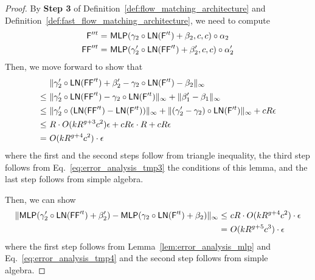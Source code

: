 \begin{proof}
    By {\bf Step 3} of Definition~\ref{def:flow_matching_architecture} and Definition~\ref{def:fast_flow_matching_architecture}, we need to compute
    \begin{align*}
        \mathsf{F}''^t =&~\mathsf{MLP}(\gamma_2 \circ \mathsf{LN}(\mathsf{F}'^t)+ \beta_2,c,c) \circ \alpha_2\\
        \mathsf{FF}''^t=&~\mathsf{MLP}(\gamma'_2 \circ \mathsf{LN}(\mathsf{FF}'^t)+ \beta'_2,c,c) \circ \alpha'_2
    \end{align*}
    Then, we move forward to show that
    \begin{align}\label{eq:error_analysis_tmp4}
        &~\|\gamma'_2 \circ \mathsf{LN}(\mathsf{FF}'^t)+ \beta'_2 - \gamma_2 \circ \mathsf{LN}(\mathsf{F}'^t) -\beta_2 \|_\infty\notag\\
        \leq&~ \| \gamma'_2 \circ \mathsf{LN}(\mathsf{FF}'^t)- \gamma_2 \circ \mathsf{LN}(\mathsf{F}'^t) \|_\infty + \|\beta'_1-\beta_1\|_\infty\notag\\
        \leq&~\|\gamma'_2\circ(\mathsf{LN}(\mathsf{FF}'^t) - \mathsf{LN}(\mathsf{F}'^t)) \|_\infty+ \|(\gamma'_2-\gamma_2)\circ \mathsf{LN}(\mathsf{F}'^t)\|_\infty + cR\epsilon\notag\\
        \leq&~ R \cdot O(kR^{g+3}c^2) \epsilon + cR\epsilon \cdot R + cR\epsilon\notag\\
        =&~ O(kR^{g+4}c^2)\cdot \epsilon
    \end{align}
    where the first and the second steps follow from triangle inequality, the third step follows from Eq.~\eqref{eq:error_analysis_tmp3} the conditions of this lemma, and the last step follows from simple algebra.

    Then, we can show
    \begin{align}\label{eq:error_analysis_tmp5}
        \|\mathsf{MLP}(\gamma'_2 \circ \mathsf{LN}(\mathsf{FF}'^t)+ \beta'_2)-\mathsf{MLP}(\gamma_2 \circ \mathsf{LN}(\mathsf{F}'^t) +\beta_2)\|_\infty \leq&~  c R \cdot O(kR^{g+4} c^2) \cdot \epsilon\notag\\
        =&~ O(kR^{g+5}c^3)\cdot \epsilon
    \end{align}
    where the first step follows from Lemma~\ref{lem:error_analysis_mlp} and Eq.~\eqref{eq:error_analysis_tmp4} and the second step follows from simple algebra.


\end{proof}
